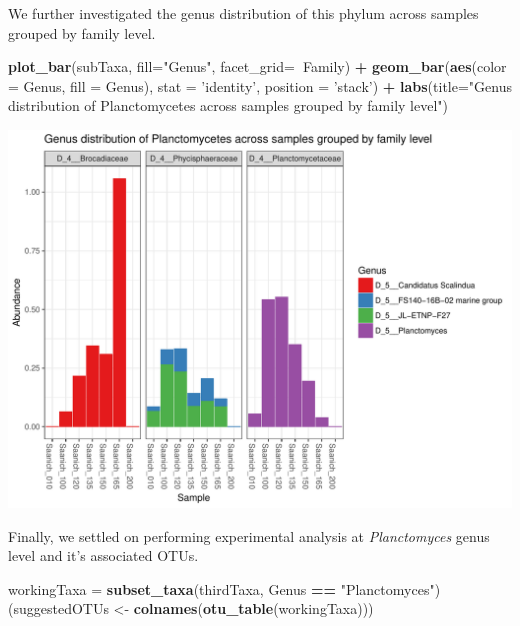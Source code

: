 \documentclass[11 pt,]{article}
\newenvironment{Shaded}{\begin{snugshade}}{\end{snugshade}}
\newcommand{\KeywordTok}[1]{\textcolor[rgb]{0.13,0.29,0.53}{\textbf{#1}}}
\newcommand{\DataTypeTok}[1]{\textcolor[rgb]{0.13,0.29,0.53}{#1}}
\newcommand{\StringTok}[1]{\textcolor[rgb]{0.31,0.60,0.02}{#1}}
\newcommand{\OperatorTok}[1]{\textcolor[rgb]{0.81,0.36,0.00}{\textbf{#1}}}
\newcommand{\NormalTok}[1]{#1}
\begin{document}
We further investigated the genus distribution of this phylum across
samples grouped by family level.

\begin{Shaded}
\begin{Highlighting}[]
\KeywordTok{plot_bar}\NormalTok{(subTaxa, }\DataTypeTok{fill=}\StringTok{"Genus"}\NormalTok{, }\DataTypeTok{facet_grid=}\OperatorTok{~}\NormalTok{Family) }\OperatorTok{+}\StringTok{ }
\StringTok{  }\KeywordTok{geom_bar}\NormalTok{(}\KeywordTok{aes}\NormalTok{(}\DataTypeTok{color =}\NormalTok{ Genus, }\DataTypeTok{fill =}\NormalTok{ Genus), }\DataTypeTok{stat =} \StringTok{'identity'}\NormalTok{, }
           \DataTypeTok{position =} \StringTok{'stack'}\NormalTok{) }\OperatorTok{+}
\StringTok{    }\KeywordTok{labs}\NormalTok{(}\DataTypeTok{title=}\StringTok{"Genus distribution of Planctomycetes across samples grouped by family level"}\NormalTok{)}
\end{Highlighting}
\end{Shaded}

\includegraphics{Figs/unnamed-chunk-10-1.pdf}

Finally, we settled on performing experimental analysis at
\emph{Planctomyces} genus level and it's associated OTUs.

\begin{Shaded}
\begin{Highlighting}[]
\NormalTok{workingTaxa =}\StringTok{ }\KeywordTok{subset_taxa}\NormalTok{(thirdTaxa, Genus }\OperatorTok{==}\StringTok{ "Planctomyces"}\NormalTok{)}
\NormalTok{(suggestedOTUs <-}\StringTok{ }\KeywordTok{colnames}\NormalTok{(}\KeywordTok{otu_table}\NormalTok{(workingTaxa)))}
\end{Highlighting}
\end{Shaded}
\end{document}
